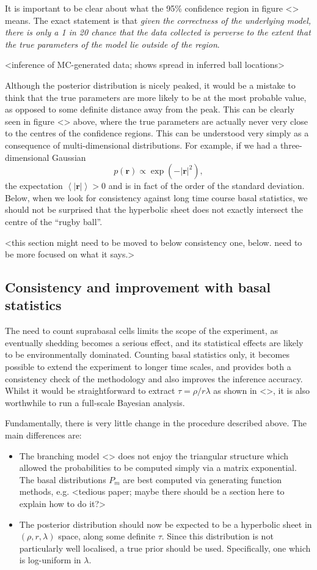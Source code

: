 \documentclass[10pt,UKenglish]{article}
\begin{document}
It is important to be clear about what the 95\% confidence region in figure <> means. The exact statement is that \emph{given the correctness of the underlying model, there is only a 1 in 20 chance that the data collected is perverse to the extent that the true parameters of the model lie outside of the region}.

<inference of MC-generated data; shows spread in inferred ball locations>

Although the posterior distribution is nicely peaked, it would be a mistake to think that the true parameters are more likely to be at the most probable value, as opposed to some definite distance away from the peak. This can be clearly seen in figure <> above, where the true parameters are actually never very close to the centres of the confidence regions. This can be understood very simply as a consequence of multi-dimensional distributions. For example, if we had a three-dimensional Gaussian $$p(\mathbf{r}) \propto \exp(-|\mathbf r|^2),$$ the expectation $\left\langle \mathbf |\mathbf r| \right\rangle > 0$ and is in fact of the order of the standard deviation. Below, when we look for consistency against long time course basal statistics, we should not be surprised that the hyperbolic sheet does not exactly intersect the centre of the ``rugby ball''.

<this section might need to be moved to below consistency one, below. need to be more focused on what it says.>

\subsection{Consistency and improvement with basal statistics}

The need to count suprabasal cells limits the scope of the experiment, as eventually shedding becomes a serious effect, and its statistical effects are likely to be environmentally dominated. Counting basal statistics only, it becomes possible to extend the experiment to longer time scales, and provides both a consistency check of the methodology and also improves the inference accuracy. Whilst it would be straightforward to extract $\tau = \rho/r\lambda$ as shown in <>, it is also worthwhile to run a full-scale Bayesian analysis.

Fundamentally, there is very little change in the procedure described above. The main differences are:

\begin{itemize}
\item The branching model <> does not enjoy the triangular structure which allowed the probabilities to be computed simply via a matrix exponential. The basal distributions $P_m$ are best computed via generating function methods, e.g. <tedious paper; maybe there should be a section here to explain how to do it?>
\item The posterior distribution should now be expected to be a hyperbolic sheet in $(\rho, r, \lambda)$ space, along some definite $\tau$. Since this distribution is not particularly well localised, a true prior should be used. Specifically, one which is log-uniform in $\lambda$.
\end{itemize}
\end{document}
